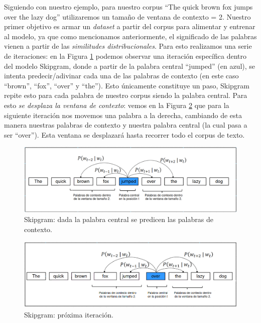 \documentclass[12pt,a4paper]{article}
\begin{document}
\begin{sloppypar}
Siguiendo con nuestro ejemplo, para nuestro corpus “The quick brown fox jumps over the lazy dog” utilizaremos un tamaño de ventana de contexto = 2.  Nuestro primer objetivo es armar un \textit{dataset} a partir del corpus para alimentar y entrenar al modelo, ya que como mencionamos anteriormente, el significado de las palabras vienen a partir de las \textit{similitudes distribucionales}. Para esto realizamos una serie de iteraciones: en la Figura \ref{fig:Imagen_NLP_19} podemos observar una iteración específica dentro del modelo Skipgram, donde a partir de la palabra central “jumped” (en azul), se intenta predecir/adivinar cada una de las palabras de contexto (en este caso “brown”, “fox”, “over” y “the”).  Esto únicamente constituye un paso, Skipgram repite esto para cada palabra de nuestro corpus siendo la palabra central. Para esto \textit{se desplaza la ventana de contexto}: vemos en la Figura \ref{fig:Imagen_NLP_20}  que para la siguiente iteración nos movemos una palabra a la derecha, cambiando de esta manera nuestras palabras de contexto y nuestra palabra central (la cual pasa a ser “over”). Esta ventana se desplazará hasta recorrer todo el corpus de texto.

\begin{figure}[H]    
 \centering
 \includegraphics[width=1\textwidth]{images/NLP/19.png}
 \caption{Skipgram: dada la palabra central se predicen las palabras de contexto.}
 \label{fig:Imagen_NLP_19}
\end{figure}

\begin{figure}[H]    
 \centering
 \includegraphics[width=1\textwidth]{images/NLP/20.png}
 \caption{Skipgram: próxima iteración.}
 \label{fig:Imagen_NLP_20}
\end{figure}


\end{sloppypar}
\end{document}
